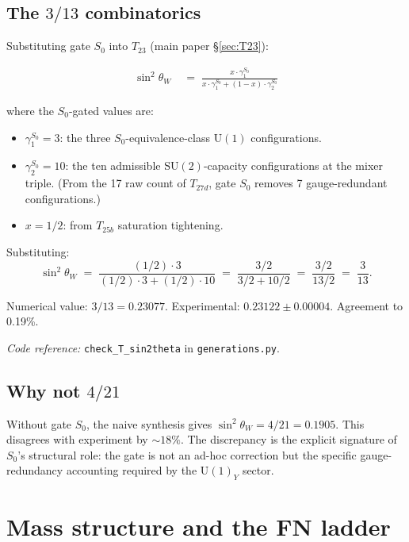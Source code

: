 \documentclass[11pt]{article}
\newcommand{\coderef}[2]{\smallskip\noindent\textit{Code reference:} \texttt{#1} in \texttt{#2}.}
\newcommand{\SU}{\mathrm{SU}}
\newcommand{\Un}{\mathrm{U}}
\theoremstyle{definition}
\begin{document}
\subsection{The \texorpdfstring{$3/13$}{3/13} combinatorics}\label{sec:3_over_13_combinatorics}

Substituting gate $S_0$ into $T_{23}$ (main paper \S\ref{sec:T23}):

\begin{align*}
\sin^2\theta_W
&\;=\; \frac{x \cdot \gamma_1^{S_0}}{x \cdot \gamma_1^{S_0} + (1-x) \cdot \gamma_2^{S_0}}
\end{align*}

where the $S_0$-gated values are:
\begin{itemize}
    \item $\gamma_1^{S_0} = 3$: the three $S_0$-equivalence-class $\Un(1)$ configurations.
    \item $\gamma_2^{S_0} = 10$: the ten admissible $\SU(2)$-capacity configurations at the mixer triple. (From the 17 raw count of $T_{27d}$, gate $S_0$ removes 7 gauge-redundant configurations.)
    \item $x = 1/2$: from $T_{25b}$ saturation tightening.
\end{itemize}

Substituting:
\[
\sin^2\theta_W \;=\; \frac{(1/2) \cdot 3}{(1/2) \cdot 3 + (1/2) \cdot 10} \;=\; \frac{3/2}{3/2 + 10/2} \;=\; \frac{3/2}{13/2} \;=\; \frac{3}{13}.
\]

Numerical value: $3/13 = 0.23077$. Experimental: $0.23122 \pm 0.00004$. Agreement to 0.19\%.

\coderef{check\_T\_sin2theta}{generations.py}

\subsection{Why not \texorpdfstring{$4/21$}{4/21}}\label{sec:4over21_excluded}

Without gate $S_0$, the naive synthesis gives $\sin^2\theta_W = 4/21 = 0.1905$. This disagrees with experiment by $\sim 18\%$. The discrepancy is the explicit signature of $S_0$'s structural role: the gate is not an ad-hoc correction but the specific gauge-redundancy accounting required by the $\Un(1)_Y$ sector.

\clearpage

\section{Mass structure and the FN ladder}\label{sec:mass_structure_full}
\end{document}

